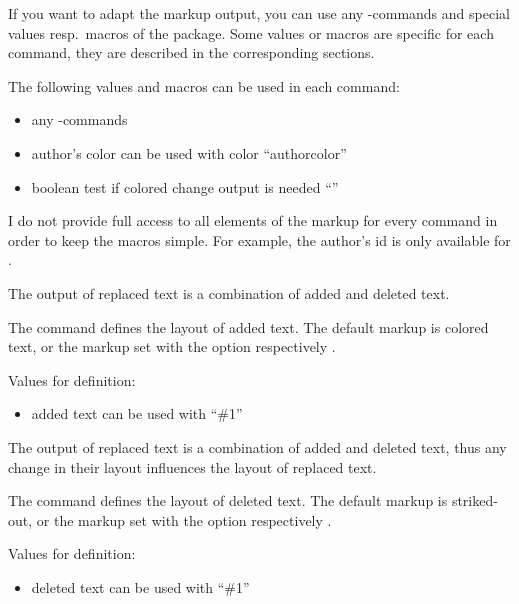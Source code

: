 If you want to adapt the markup output, you can use any -commands and special values resp.\ macros of the  package.
Some values or macros are specific for each command, they are described in the corresponding sections.

The following values and macros can be used in each command:

\begin{itemize}
	\item any -commands
	\item author's color can be used with color ``authorcolor''
	\item boolean test if colored change output is needed ``''
\end{itemize}

I do not provide full access to all elements of the markup for every command in order to keep the macros simple.
For example, the author's id is only available for .

The output of replaced text is a combination of added and deleted text.




The command  defines the layout of added text.
The default markup is colored text, or the markup set with the option  respectively .

Values for definition:

\begin{itemize}
	\item added text can be used with ``\#1''
\end{itemize}

The output of replaced text is a combination of added and deleted text, thus any change in their layout influences the layout of replaced text.





The command  defines the layout of deleted text.
The default markup is striked-out, or the markup set with the option  respectively .

Values for definition:

\begin{itemize}
	\item deleted text can be used with ``\#1''
\end{itemize}

